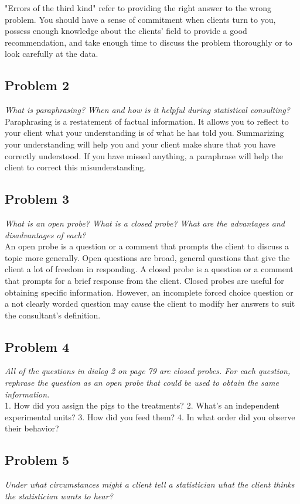 \documentclass[a4paper,11pt]{article}
\begin{document}
"Errors of the third kind" refer to providing the right answer to the wrong problem. You should have a sense of commitment when clients turn to you, possess enough knowledge about the clients' field to provide a good recommendation, and take enough time to discuss the problem thoroughly or to look carefully at the data.
\subsection*{Problem 2}
\emph{\indent What is paraphrasing? When and how is it helpful during statistical consulting?}
\\

Paraphrasing is a restatement of factual information. It allows you to reflect to your client what your understanding is of what he has told you. Summarizing your understanding will help you and your client make shure that you have correctly understood. If you have missed anything, a paraphrase will help the client to correct this misunderstanding.

\subsection*{Problem 3}
\emph{\indent What is an open probe? What is a closed probe? What are the advantages and disadvantages of each?}
\\

An open probe is a question or a comment that prompts the client to discuss a topic more generally. Open questions are broad, general questions that give the client a lot of freedom in responding.
A closed probe is a question or a comment that prompts for a brief response from the client. Closed probes are useful for obtaining specific information. However, an incomplete forced choice question or a not clearly worded question may cause the client to modify her answers to suit the consultant's definition.
\subsection*{Problem 4}
\emph{\indent All of the questions in dialog 2 on page 79 are closed probes. For each question, rephrase the question as an open probe that could be used to obtain the same information.}
\\

1. How did you assign the pigs to the treatments? 2. What's an independent experimental units?
3. How did you feed them? 4. In what order did you observe their behavior?
\subsection*{Problem 5}
\emph{\indent Under what circumstances might a client tell a statistician what the client thinks the statistician wants to hear? }
\\
\end{document}
